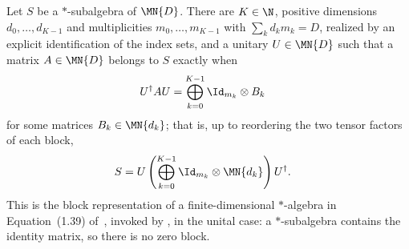 \begin{theorem}%
    \label{thm:starSubalgebra_unitary_block_diagonal_iff}
    \leanok
    Let $S$ be a $*$-subalgebra of $\MN{D}$. There are $K\in\N$, positive
    dimensions $d_0,\ldots,d_{K-1}$ and multiplicities
    $m_0,\ldots,m_{K-1}$ with $\sum_kd_km_k=D$, realized by an explicit
    identification of the index sets, and a unitary $U\in\MN{D}$ such that
    a matrix $A\in\MN{D}$ belongs to $S$ exactly when
    \begin{align}
        U^\dagger A U
        &=\bigoplus_{k=0}^{K-1}\Id_{m_k}\otimes B_k
        \label{eq:spectral_full_block}
    \end{align}
    for some matrices $B_k\in\MN{d_k}$; that is, up to reordering the two
    tensor factors of each block,
    \begin{align}
        S
        &=U\left(\bigoplus_{k=0}^{K-1}
          \Id_{m_k}\otimes\MN{d_k}\right)U^\dagger.
        \notag
    \end{align}
    This is the block representation of a finite-dimensional $*$-algebra in
    Equation~(1.39) of~\cite{Wolf2012Quantum}, invoked by
    \cite[Theorem~6.14]{Wolf2012Quantum}, in the unital case: a
    $*$-subalgebra contains the identity matrix, so there is no zero block.
\end{theorem}


